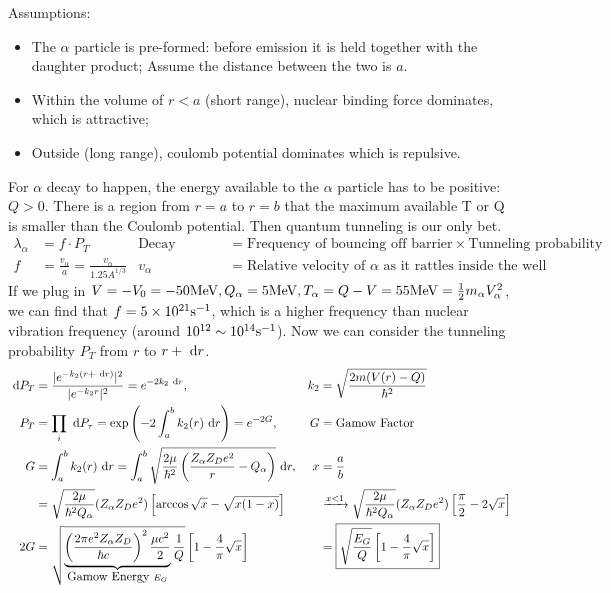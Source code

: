 \documentclass{school-22.101-notes}
\begin{document}
Assumptions:
\begin{itemize}
\item The $\alpha$ particle is pre-formed: before emission it is held together with the daughter product; Assume the distance between the two is $a$. 
\item Within the volume of $r<a$ (short range), nuclear binding force dominates, which is attractive; 
\item Outside (long range), coulomb potential dominates which is repulsive. 
\end{itemize}
For $\alpha$ decay to happen, the energy available to the $\alpha$ particle has to be positive: $Q > 0$. There is a region from $r=a$ to $r=b$ that the maximum available T or Q is smaller than the Coulomb potential. Then quantum tunneling is our only bet. 
\begin{align}
\lambda_{\alpha}&=f \cdot P_T & \mbox{Decay Constant}&=\mbox{Frequency of bouncing off barrier} \times \mbox{Tunneling probability} \\
f &= \frac{v_{\alpha}}{a} = \frac{v_{\alpha}}{1.25 A^{1/3}} & v_{\alpha} &= \mbox{Relative velocity of $\alpha$ as it rattles inside the well}
\end{align}
If we plug in $V = -V_0 = -50 \mathrm{MeV}, Q_{\alpha} = 5 \mathrm{MeV}, T_{\alpha} = Q - V = 55 \mathrm{MeV} = \frac{1}{2} m_{\alpha} V_{\alpha}^2$, we can find that $f = 5 \times 10^{21} \mathrm{s}^{-1}$, which is a higher frequency than nuclear vibration frequency (around $10^{12} \sim 10^{14} \mathrm{s}^{-1}$). Now we can consider the tunneling probability $P_T$ from $r$ to $r +\mbox{ }\mathrm{d} r$. 
\begin{align}
\mbox{ }\mathrm{d} P_T &= \frac{|e^{-k_2 (r+\mbox{ }\mathrm{d} r)}|^2}{|e^{-k_2 r}|^2} = e^{-2 k_2 \mbox{ }\mathrm{d} r}, & k_2 &= \sqrt{\frac{2m(V (r) -Q)}{\hbar^2}} \\
P_T &= \prod_i \mbox{ }\mathrm{d} P_{\tau} = \exp \left(-2 \int_a^b k_2 (r) \mbox{ }\mathrm{d} r \right) = e^{-2 G}, & G&=\mbox{Gamow Factor} \\ 
G &= \int_a^b k_2 (r) \mbox{ }\mathrm{d} r = \int_a^b \sqrt{\frac{2 \mu}{\hbar^2} \left( \frac{Z_{\alpha} Z_D e^2}{r} - Q_{\alpha} \right)} \mbox{ }\mathrm{d} r, & x &= \frac{a}{b} \\
&= \sqrt{\frac{2 \mu}{\hbar^2 Q_{\alpha}}} (Z_{\alpha} Z_D e^2) \left[ \arccos \sqrt{x} - \sqrt{x(1-x)} \right]  &
&\xrightarrow{x < 1} \sqrt{\frac{2 \mu}{\hbar^2 Q_{\alpha}}} (Z_{\alpha} Z_D e^2) \left[ \frac{\pi}{2} - 2 \sqrt{x} \right] \\
2G &= \sqrt{ 
\underbrace{ \left(\frac{2 \pi e^2 Z_{\alpha} Z_D}{\hbar c}\right)^2 \frac{\mu c^2}{2} }_{\mbox{Gamow Energy } E_G} 
\frac{1}{Q}} \left[ 1 - \frac{4}{\pi} \sqrt{x} \right] &
&= \boxed{ \sqrt{\frac{E_G}{Q}} \left[ 1 - \frac{4}{\pi} \sqrt{x} \right] }
\end{align}
\end{document}
